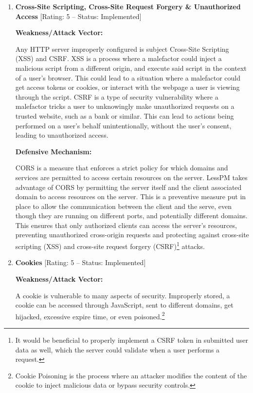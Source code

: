 \begin{enumerate}[label=$\blacktriangleright$]
  \item \textbf{
    Cross-Site Scripting,
    Cross-Site Request Forgery
    \& Unauthorized Access} [Rating: 5 -- Status: Implemented]

  \textbf{Weakness/Attack Vector:}

  Any HTTP server improperly configured is subject Cross-Site Scripting (XSS)
  and CSRF\@.
  XSS is a process where a malefactor could inject a malicious script from a
  different origin, and execute said script in the context of a user's browser.
  This could lead to a situation where a malefactor could get access tokens
  or cookies, or interact with the webpage a user is viewing through the
  script.
  CSRF is a type of security vulnerability where a malefactor tricks a user
  to unknowingly make unauthorized requests on a trusted website, such as a
  bank or similar.
  This can lead to actions being performed on a user's behalf unintentionally,
  without the user's consent, leading to unauthorized access.

  \textbf{Defensive Mechanism:}

  CORS is a measure that enforces a strict policy for which domains and services
  are permitted to access certain resources on the server.
  LessPM takes advantage of CORS by permitting the server itself and the
  client associated domain to access resources on the server.
  This is a preventive measure put in place to allow the communication
  between the client and the serve, even though they are running on different
  ports, and potentially different domains.
  This ensures that only authorized clients can access the server's resources,
  preventing unauthorized cross-origin requests and protecting against
  cross-site scripting (XSS) and cross-site request forgery (CSRF)\footnote{
    It would be beneficial to properly implement a CSRF token in submitted
    user data as well, which the server could validate when a user performs a
    request.
  } attacks.

  \item \textbf{Cookies} [Rating: 5 -- Status: Implemented]

  \textbf{Weakness/Attack Vector:}

  A cookie is vulnerable to many aspects of security.
  Improperly stored, a cookie can be accessed through JavaScript, sent to
  different domains, get hijacked, excessive expire time, or even poisoned.\footnote{
    Cookie Poisoning is the process where an attacker modifies the content of
    the cookie to inject malicious data or bypass security controls.
  }


\end{enumerate}
